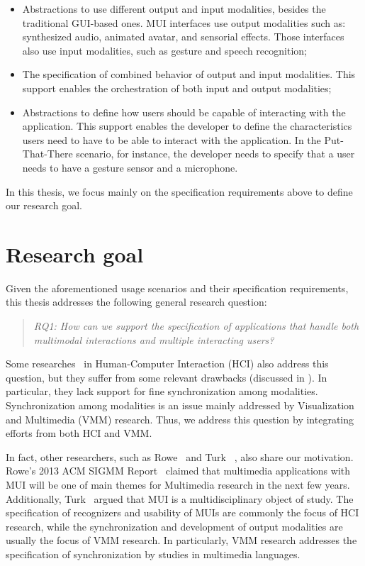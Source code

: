 \begin{itemize}
	\item Abstractions to use different output and input modalities, besides the
	traditional GUI-based ones. MUI interfaces use output modalities such as:
	synthesized audio, animated avatar, and sensorial effects. Those interfaces
	also use input modalities, such as gesture and speech recognition;
	\item The specification of combined behavior of output and input modalities.
	This support enables the orchestration of both input and output modalities;
	\item Abstractions to define how users should be capable of interacting with
	the application. This support enables the developer to define the
	characteristics users need to have to be able to interact with the
	application. In the Put-That-There scenario, for instance, the developer needs
	to specify that a user needs to have a gesture sensor and a microphone.
\end{itemize}

In this thesis, we focus mainly on the specification requirements above to
define our research goal.

\section{Research goal}
\label{sec:intro:goal}

Given the aforementioned usage scenarios and their specification requirements,
this thesis addresses the following general research question:

\begin{quote}
	\textit{RQ1: How can we support the specification of applications that handle
	both multimodal interactions and multiple interacting users?}
\end{quote}

Some
researches~\cite{dumas_description_2010,katsurada_xisl:_2005,w3c_multimodal_2003}
in Human-Computer Interaction (HCI) also address
this question, but they suffer from some relevant drawbacks (discussed in
). In particular, they lack support for fine synchronization
among modalities. Synchronization among modalities is an issue mainly addressed
by Visualization and Multimedia (VMM) research. Thus, we address this question
by integrating efforts from both HCI and VMM.

In fact, other researchers, such as Rowe~\cite{rowe_looking_2013} and Turk
~\cite{turk_multimodal_2014}, also share our motivation. Rowe’s 2013 ACM SIGMM
Report~\cite{rowe_looking_2013} claimed that multimedia applications with MUI
will be one of main themes for Multimedia research in the next few years.
Additionally, Turk~\cite{turk_multimodal_2014} argued that MUI is a
multidisciplinary object of study. The specification of recognizers and
usability of MUIs are commonly the focus of HCI research, while the
synchronization and development of output modalities are usually the focus of
VMM research. In particularly, VMM research addresses the specification of
synchronization by studies in multimedia languages.

